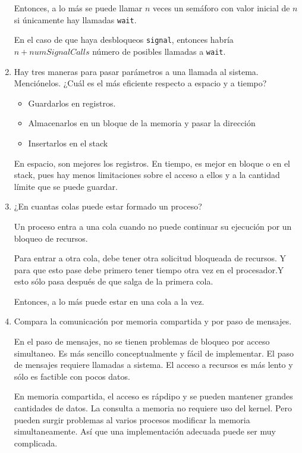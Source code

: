\documentclass{article}
\begin{document}
\begin{enumerate}
        Entonces, a lo más se puede llamar $n$ veces un semáforo con valor 
        inicial de $n$ si únicamente hay llamadas \texttt{wait}.

        En el caso de que haya desbloqueos \texttt{signal}, entonces habría 
        $n + numSignalCalls$ número de posibles llamadas a \texttt{wait}.

        \item Hay tres maneras para pasar parámetros a una llamada al sistema.
        Menciónelos. ¿Cuál es el más eficiente respecto a espacio y a tiempo?

        \begin{itemize}
            \item{Guardarlos en registros.}
            \item{Almacenarlos en un bloque de la memoria y pasar la dirección}
            \item{Insertarlos en el stack}
        \end{itemize}

        En espacio, son mejores los registros. 
        En tiempo, es mejor en bloque o en el stack, pues hay menos limitaciones
        sobre el acceso a ellos y a la cantidad límite que se puede guardar.

        \item ¿En cuantas colas puede estar formado un proceso?

        Un proceso entra a una cola cuando no puede continuar su ejecución por 
        un bloqueo de recursos.

        Para entrar a otra cola, debe tener otra solicitud bloqueada de 
        recursos. Y para que esto pase debe primero tener tiempo otra vez en el
        procesador.Y esto sólo pasa después de que salga de la primera cola.

        Entonces, a lo más puede estar en una cola a la vez.

        \item Compara la comunicación por memoria compartida y por paso de 
        mensajes.

        En el paso de mensajes, no se tienen problemas de bloqueo por acceso
        simultaneo. Es más sencillo conceptualmente y fácil de implementar.
        El paso de mensajes requiere llamadas a sistema. El acceso a recursos es
        más lento y sólo es factible con pocos datos. 

        En memoria compartida, el acceso es rápdipo y se pueden mantener grandes
        cantidades de datos. La consulta a memoria no requiere uso del kernel.
        Pero pueden surgir problemas al varios procesos modificar la memoria 
        simultaneamente. Así que una implementación adecuada puede ser muy 
        complicada.


\end{enumerate}
\end{document}
